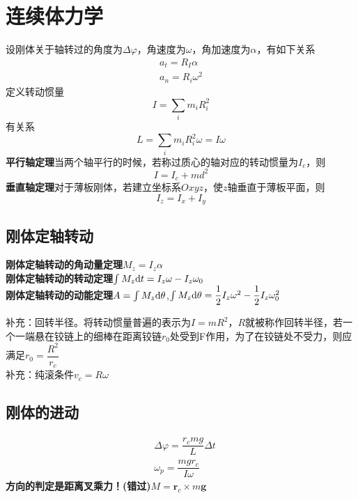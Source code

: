 \section{连续体力学}

设刚体关于轴转过的角度为$\Delta \varphi$，角速度为$\omega$，角加速度为$\alpha$，有如下关系
\begin{align}\label{key}
	a_t=R_I\alpha\\
	a_n=R_i\omega^2
\end{align}
定义转动惯量
\begin{equation}\label{key}
	I=\sum_{i}m_iR_i^2
\end{equation}
有关系
\begin{equation}\label{key}
	L=\sum_{i}m_iR^2_i\omega =I\omega
\end{equation}
\textbf{平行轴定理}\quad 当两个轴平行的时候，若称过质心的轴对应的转动惯量为$I_c$，则
\begin{equation}\label{key}
	I=I_c+md^2
\end{equation}
\textbf{垂直轴定理}\quad 对于薄板刚体，若建立坐标系$Oxyz$，使$z$轴垂直于薄板平面，则
\begin{equation}\label{key}
	I_z=I_x+I_y
\end{equation}
\subsection{刚体定轴转动}
\noindent\textbf{刚体定轴转动的角动量定理}\quad $ M_z=I_z\alpha $\\
\textbf{刚体定轴转动的转动定理}\quad  $ \int M_z\mathrm{d} t=I_z\omega -I_z\omega_0 $\\
\textbf{刚体定轴转动的动能定理}\quad $ A=\int M_z\mathrm{d} \theta $,$ \int M_z\mathrm{d} \theta=\dfrac{1}{2}I_z\omega^2 -\dfrac{1}{2}I_z\omega_0^2 $

补充：回转半径。将转动惯量普遍的表示为$I=mR^2$，$ R $就被称作回转半径，若一个一端悬在铰链上的细棒在距离铰链$r_0$处受到F作用，为了在铰链处不受力，则应满足$r_0=\dfrac{R^2}{r_c}$\\
补充：纯滚条件$v_c=R\omega$
\subsection{刚体的进动}
\begin{align}
	&\Delta \varphi=\dfrac{r_cmg}{L}\Delta t\\
	&\omega_p=\dfrac{mgr_c}{I\omega}
\end{align}
\textbf{方向的判定是距离叉乘力！(错过)}\quad $M=\bm{r}_c\times m\bm{g}$

